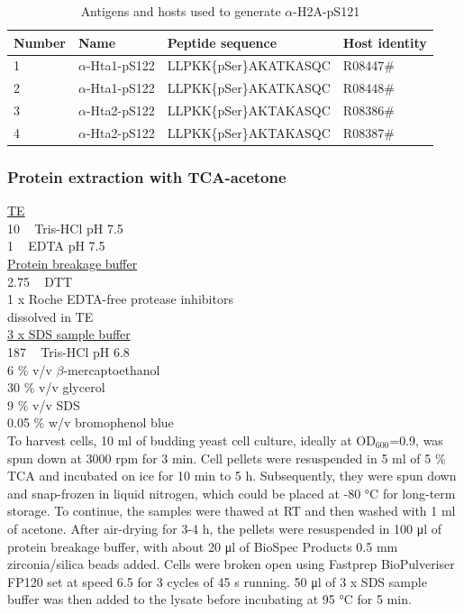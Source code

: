 \begin{table}[htbp]
\centering
\caption{Antigens and hosts used to generate $\alpha$-H2A-pS121}
\label{tab:genscript}
\begin{tabular}{llll}
\hline
\textbf{Number} & \textbf{Name} & \textbf{Peptide sequence} & \textbf{Host identity} \\ \hline
1 & $\alpha$-Hta1-pS122 & LLPKK\{pSer\}AKATKASQC & R08447\# \\   
2 & $\alpha$-Hta1-pS122 & LLPKK\{pSer\}AKATKASQC & R08448\# \\   
3 & $\alpha$-Hta2-pS122 & LLPKK\{pSer\}AKTAKASQC & R08386\# \\   
4 & $\alpha$-Hta2-pS122 & LLPKK\{pSer\}AKTAKASQC & R08387\# \\   
\end{tabular}
\end{table}


\subsubsection{Protein extraction with TCA-acetone}

\underline{TE}\\
10 \si{\milli\Molar} Tris-HCl pH 7.5\\
1 \si{\milli\Molar} EDTA pH 7.5\\

\underline{Protein breakage buffer}\\
2.75 \si{\milli\Molar} DTT \\
1 x Roche EDTA-free protease inhibitors \\
dissolved in TE\\

\underline{3 x SDS sample buffer} \\
187 \si{\milli\Molar} Tris-HCl pH 6.8\\
6 \% v/v $\beta$-mercaptoethanol\\
30 \% v/v glycerol\\
9 \% v/v SDS\\
0.05 \% w/v bromophenol blue\\

To harvest cells, 10 \si{\milli\litre} of budding yeast cell culture, ideally at OD$_{600}$=0.9, was spun down at 3000 rpm for 3 \si{\minute}. Cell pellets were resuspended in 5 \si{\milli\litre} of 5 \% TCA and incubated on ice for 10 \si{\minute} to 5 \si{\hour}. Subsequently, they were spun down and snap-frozen in liquid nitrogen, which could be placed at -80 \si{\celsius} for long-term storage. To continue, the samples were thawed at RT and then washed with 1 \si{\milli\litre} of acetone. After air-drying for 3-4 \si{\hour}, the pellets were resuspended in 100 \si{\micro\litre} of protein breakage buffer, with about 20 \si{\micro\litre} of BioSpec Products 0.5 \si{\milli\metre} zirconia/silica beads added. Cells were broken open using Fastprep BioPulveriser FP120 set at speed 6.5 for 3 cycles of 45 \si{\second} running. 50 \si{\micro\litre} of 3 x SDS sample buffer was then added to the lysate before incubating at 95 \si{\celsius} for 5 \si{\minute}. 

